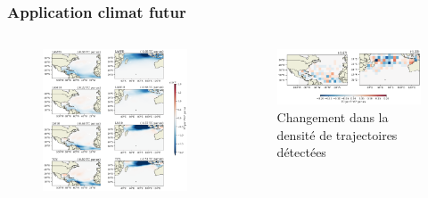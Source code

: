 \documentclass[aspectratio=169, usepdftitle=false, xcolor={dvipsnames}, 9pt,table]{beamer}
\begin{document}
\begin{frame}[c]
    \frametitle{Application climat futur}
    \begin{columns}
        \begin{column}{0.5\textwidth}
            \begin{figure}
                \centering
                \includegraphics[width=\textwidth]{Figures/Annexes/delta_F_P.png}
            \end{figure}
        \end{column}
        \begin{column}{0.5\textwidth}
            \begin{figure}
                \centering
                \caption*{\small Changement dans la densité de trajectoires détectées}
                \includegraphics[width=\textwidth]{Figures/Annexes/diff_density.png}
            \end{figure}
        \end{column}
    \end{columns}
\end{frame}
\end{document}
